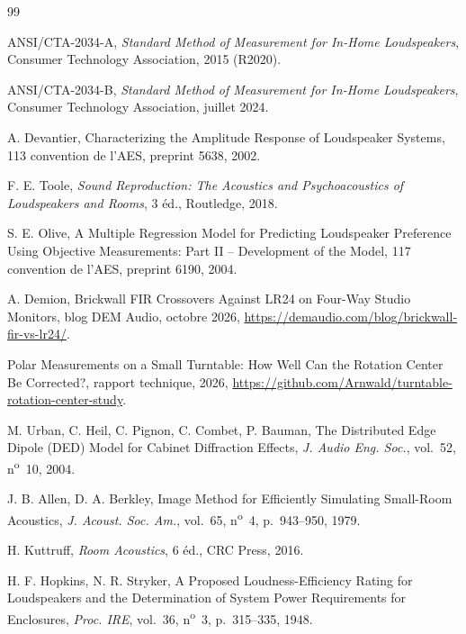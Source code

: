 \documentclass[11pt,a4paper]{article}
\begin{document}
\begin{thebibliography}{99}

 ANSI/CTA-2034-A, \emph{Standard Method of Measurement for In-Home Loudspeakers},
Consumer Technology Association, 2015 (R2020).

 ANSI/CTA-2034-B, \emph{Standard Method of Measurement for In-Home Loudspeakers},
Consumer Technology Association, juillet 2024.

 A. Devantier, \og Characterizing the Amplitude Response of Loudspeaker
Systems\fg{}, 113\ieme{} convention de l'AES, preprint 5638, 2002.

 F. E. Toole, \emph{Sound Reproduction: The Acoustics and Psychoacoustics of
Loudspeakers and Rooms}, 3\ieme{} éd., Routledge, 2018.

 S. E. Olive, \og A Multiple Regression Model for Predicting Loudspeaker Preference
Using Objective Measurements: Part II -- Development of the Model\fg{}, 117\ieme{} convention de l'AES,
preprint 6190, 2004.

 A. Demion, \og Brickwall FIR Crossovers Against LR24 on Four-Way Studio
Monitors\fg{}, blog DEM Audio, octobre 2026, \url{https://demaudio.com/blog/brickwall-fir-vs-lr24/}.

 \og Polar Measurements on a Small Turntable: How Well Can the Rotation Center Be
Corrected?\fg{}, rapport technique, 2026,
\url{https://github.com/Arnwald/turntable-rotation-center-study}.

 M. Urban, C. Heil, C. Pignon, C. Combet, P. Bauman, \og The Distributed Edge Dipole
(DED) Model for Cabinet Diffraction Effects\fg{}, \emph{J. Audio Eng. Soc.}, vol.~52, n\textsuperscript{o}~10,
2004.

 J. B. Allen, D. A. Berkley, \og Image Method for Efficiently Simulating Small-Room
Acoustics\fg{}, \emph{J. Acoust. Soc. Am.}, vol.~65, n\textsuperscript{o}~4, p.~943--950, 1979.

 H. Kuttruff, \emph{Room Acoustics}, 6\ieme{} éd., CRC Press, 2016.

 H. F. Hopkins, N. R. Stryker, \og A Proposed Loudness-Efficiency Rating for
Loudspeakers and the Determination of System Power Requirements for Enclosures\fg{}, \emph{Proc. IRE},
vol.~36, n\textsuperscript{o}~3, p.~315--335, 1948.


\end{thebibliography}
\end{document}
